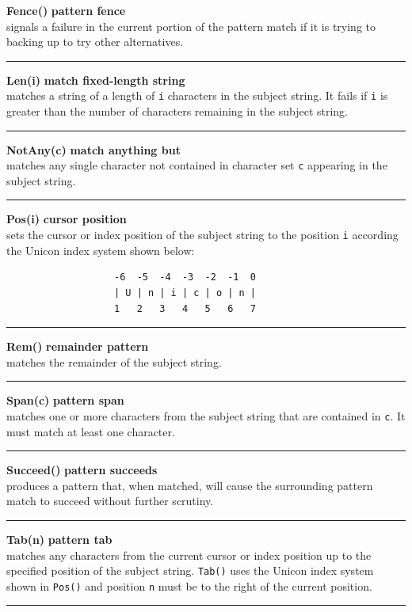 \documentclass[letterpaper,12pt]{article}
\begin{document}
{\noindent\textbf{Fence()} \hfill\textbf{pattern fence}\\
signals a failure in the current portion of the pattern match
if it is trying to backing up to try other alternatives.\\
\noindent\rule{16.5cm}{0.1pt}

\noindent\textbf{Len(i)} \hfill\textbf{match fixed-length string}\\
matches a string of a length of \texttt{i} characters in the subject string.
It fails if \texttt{i} is greater than the number of characters remaining
in the subject string.\\
\noindent\rule{16.5cm}{0.1pt}

\noindent\textbf{NotAny(c)} \hfill\textbf{match anything but}\\
matches any single character not contained in character set \texttt{c}
appearing in the subject string.\\
\noindent\rule{16.5cm}{0.1pt}

\noindent\textbf{Pos(i)} \hfill\textbf{cursor position}\\
sets the cursor or index position of the subject string to
the position \texttt{i} according the Unicon index system shown below:
\begin{verbatim}
                   -6  -5  -4  -3  -2  -1  0
                   | U | n | i | c | o | n |
                   1   2   3   4   5   6   7
\end{verbatim}
\noindent\rule{16.5cm}{0.1pt}

\noindent\textbf{Rem()} \hfill\textbf{remainder pattern}\\
matches the remainder of the subject string.\\
\noindent\rule{16.5cm}{0.1pt}

\noindent\textbf{Span(c)} \hfill\textbf{pattern span}\\
matches one or more characters from the subject string that
are contained in \texttt{c}.  It must match at least one character.\\
\noindent\rule{16.5cm}{0.1pt}

\noindent\textbf{Succeed()} \hfill\textbf{pattern succeeds}\\
produces a pattern that, when matched, will cause the surrounding
pattern match to succeed without further scrutiny.\\
\noindent\rule{16.5cm}{0.1pt}

\noindent\textbf{Tab(n)} \hfill\textbf{pattern tab}\\
matches any characters from the current cursor or index position up to
the specified position of the subject string.  \texttt{Tab()} uses the
Unicon index system shown in \texttt{Pos()} and position \texttt{n} must
be to the right of the current position.\\
\noindent\rule{16.5cm}{0.1pt}

}
\end{document}
